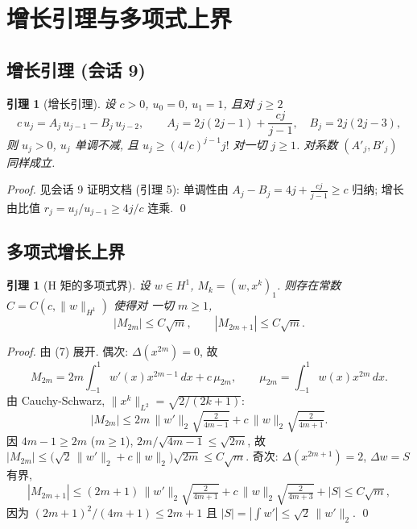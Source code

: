 \documentclass[UTF8]{ctexart}
\newtheorem{lemma}[theorem]{引理}
\begin{document}
\section{增长引理与多项式上界}

\subsection{增长引理 (会话 9)}

\begin{lemma}[增长引理]
设 $c > 0$, $u_0 = 0$, $u_1 = 1$, 且对 $j \geq 2$
\begin{equation}
	c\, u_j = A_j\, u_{j-1} - B_j\, u_{j-2},
	\qquad A_j = 2j(2j-1) + \frac{cj}{j-1}, \quad B_j = 2j(2j-3),
\end{equation}
则 $u_j > 0$, $u_j$ 单调不减, 且 $u_j \geq (4/c)^{j-1} j!$ 对一切 $j \geq 1$.
对系数 $(A'_j, B'_j)$ 同样成立.
\end{lemma}

\begin{proof}
见会话 9 证明文档 (引理 5): 单调性由 $A_j - B_j = 4j + \tfrac{cj}{j-1} \geq c$
归纳; 增长由比值 $r_j = u_j/u_{j-1} \geq 4j/c$ 连乘. \qed
\end{proof}

\subsection{多项式增长上界}

\begin{lemma}[H 矩的多项式界]
设 $w \in H^1$, $M_k = (w, x^k)_1$. 则存在常数 $C = C(c, \|w\|_{H^1})$ 使得对
一切 $m \geq 1$,
\begin{equation}
	|M_{2m}| \leq C \sqrt{m}, \qquad |M_{2m+1}| \leq C \sqrt{m}.
\end{equation}
\end{lemma}

\begin{proof}
由 (7) 展开. 偶次: $\Delta(x^{2m}) = 0$, 故
\[
	M_{2m} = 2m \int_{-1}^{1} w'(x) x^{2m-1}\, dx + c\, \mu_{2m},
	\qquad \mu_{2m} = \int_{-1}^{1} w(x) x^{2m}\, dx.
\]
由 Cauchy-Schwarz, $\|x^k\|_{L^2} = \sqrt{2/(2k+1)}$:
\[
	|M_{2m}| \leq 2m\, \|w'\|_2 \sqrt{\tfrac{2}{4m-1}}
		+ c\, \|w\|_2 \sqrt{\tfrac{2}{4m+1}}.
\]
因 $4m - 1 \geq 2m$ ($m \geq 1$), $2m / \sqrt{4m-1} \leq \sqrt{2m}$, 故
$|M_{2m}| \leq \bigl( \sqrt{2}\, \|w'\|_2 + c\|w\|_2 \bigr) \sqrt{2m} \leq C\sqrt{m}$.
奇次: $\Delta(x^{2m+1}) = 2$, $\Delta w = S$ 有界,
\[
	|M_{2m+1}| \leq (2m+1)\, \|w'\|_2 \sqrt{\tfrac{2}{4m+1}}
		+ c\, \|w\|_2 \sqrt{\tfrac{2}{4m+3}} + |S| \leq C\sqrt{m},
\]
因为 $(2m+1)^2 / (4m+1) \leq 2m+1$ 且 $|S| = |\int w'| \leq \sqrt2\, \|w'\|_2$.
\qed
\end{proof}
\end{document}
